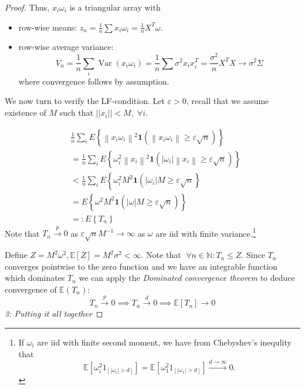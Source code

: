 \documentclass[11pt, %
	oneside, %
	english, %
	onehalfspacing, %
	]{article} %
\numberwithin{equation}{section}
\begin{document}
\begin{proof}
    Thus, $x_i \omega_i$ is a triangular array with
    \begin{itemize}
        \item row-wise means: $z_n = \frac{1}{n} \sum x_i \omega_i = \frac{1}{n} X^T \omega$.
        \item row-wise average variance:
        \begin{equation}\label{eq.rowwisevar}
            V_n = \frac{1}{n} \sum_i \operatorname{Var} \left( x_i \omega_i \right) = \frac{1}{n} \sum \sigma^2 x_i x_i^T = \frac{\sigma^2}{n} X^T X \to \sigma^2 \Sigma
        \end{equation}
        where convergence follows by assumption.
    \end{itemize}

    We now turn to verify the LF-condition. Let $\varepsilon > 0$, recall that we assume existence of $M$ such that $||x_i|| < M, \;\forall i$.

    $$
    \begin{aligned}
    & \frac{1}{n} \sum_i E\left\{\left\|x_i \omega_i\right\|^2 \mathbf{1}\left(\left\|x_i \omega_i\right\| \geqslant \varepsilon \sqrt{n}\right)\right\} \\
    & =\frac{1}{n} \sum_i E\left\{\omega_i^2\left\|x_i\right\|^2 \mathbf{1}\left(\left|\omega_i\right|\left\|x_i\right\| \geqslant \varepsilon \sqrt{n}\right)\right\} \\
    & <\frac{1}{n} \sum_i E\left\{\omega_i^2 M^2 \mathbf{1}\left(\left|\omega_i\right| M \geqslant \varepsilon \sqrt{n}\right\}\right.  \\
    & =E\left\{\omega^2 M^2 \mathbf{1}(|\omega| M \geqslant \varepsilon \sqrt{n})\right\} \\
    & =: E\left\{T_n\right\}
    \end{aligned}
    $$
    Note that $T_n \overset{p}{\to} 0$ as $\varepsilon \sqrt{ n } M^{-1} \to \infty$ as $\omega$ are iid with finite variance.\footnote{If $\omega_i$ are iid with finite second moment, we have from Chebyshev's inequlity that
    \begin{equation*}
        \mathbb{E} \left[\omega_i^2 1_{\left[\left|\omega_i\right|>d\right]}\right]=\mathbb{E} \left[\omega_1^2 1_{\left[\left|\omega_1\right|>d\right]}\right] \xrightarrow{d \rightarrow \infty} 0 .
    \end{equation*}
     }

    Define $Z = M^2 \omega^2, \mathbb{E} \left[ Z\right] = M^2 \sigma^2 < \infty$. Note that $\;\forall n \in  \mathbb{N}: T_n \leq Z$. Since $T_n$ converges pointwise to the zero function and we have an integrable function which dominates $T_n$ we can apply the \emph{Dominated convergence theorem} to deduce convergence of $\mathbb{E}(T_n)$:
    $$
    T_n \overset{p}{\to} 0 \implies T_n \overset{d}{\to} 0 \implies \mathbb{E} \left[ T_n\right] \to 0
    $$
    \emph{3: Putting it all together}


\end{proof}
\end{document}
